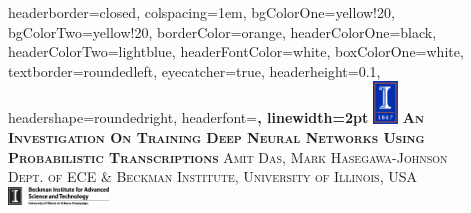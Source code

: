 \documentclass[landscape,paperwidth=58in,paperheight=40in,fontscale=0.285]{baposter} %
\begin{document}
\begin{poster}
{
headerborder=closed, %
colspacing=1em, %
bgColorOne=yellow!20, %
bgColorTwo=yellow!20, %
borderColor=orange, %
headerColorOne=black, %
headerColorTwo=lightblue, %
headerFontColor=white, %
boxColorOne=white, %
textborder=roundedleft, %
eyecatcher=true, %
headerheight=0.1\textheight, %
headershape=roundedright, %
headerfont=\Large\bf\textsc, %
linewidth=2pt %
}
%
{\includegraphics[height=0.07\textwidth, width=0.05\textwidth]{imark_1867_bold.png}} %
{\bf\textsc{An Investigation On Training Deep Neural Networks Using Probabilistic Transcriptions}\vspace{0.1em}} %
{\textsc{Amit Das, Mark Hasegawa-Johnson}\\\hspace{5pt}\textsc{Dept. of ECE \& Beckman Institute, University of Illinois, USA}} %
{\vspace{-1em}\includegraphics[width=0.20\textwidth, height=0.035\textwidth]{BeckmanLogo}}%


\end{poster}
\end{document}
